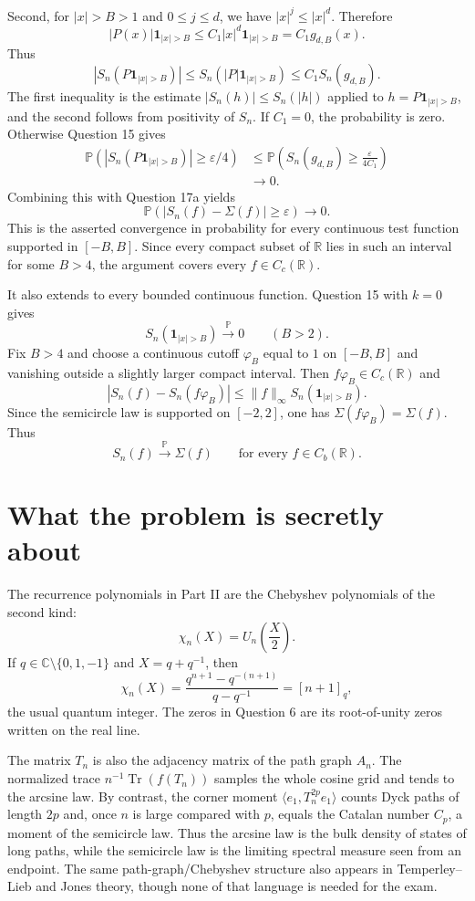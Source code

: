 \documentclass[11pt,a4paper]{article}
\newcommand{\R}{\mathbb{R}}
\newcommand{\C}{\mathbb{C}}
\newcommand{\Prob}{\mathbb{P}}
\newcommand{\one}{\mathbf{1}}
\DeclareMathOperator{\Tr}{Tr}
\begin{document}
Second, for $|x|>B>1$ and $0\le j\le d$, we have $|x|^j\le |x|^d$.  Therefore
\[
  |P(x)|\one_{|x|>B}
  \le C_1 |x|^d\one_{|x|>B}=C_1 g_{d,B}(x).
\]
Thus
\[
  |S_n(P\one_{|x|>B})|
  \le S_n(|P|\one_{|x|>B})
  \le C_1 S_n(g_{d,B}).
\]
The first inequality is the estimate $|S_n(h)|\le S_n(|h|)$ applied to
$h=P\one_{|x|>B}$, and the second follows from positivity of $S_n$.
If $C_1=0$, the probability is zero.  Otherwise Question 15 gives
\[
\begin{aligned}
 \Prob(|S_n(P\one_{|x|>B})|\ge\varepsilon/4)
 &\le \Prob\left(S_n(g_{d,B})\ge\frac{\varepsilon}{4C_1}\right)\\
 &\longrightarrow0.
\end{aligned}
\]
Combining this with Question 17a yields
\[
  \boxed{\Prob(|S_n(f)-\Sigma(f)|\ge\varepsilon)\longrightarrow0.}
\]
This is the asserted convergence in probability for every continuous test
function supported in $[-B,B]$.  Since every compact subset of $\R$ lies in
such an interval for some $B>4$, the argument covers every $f\in C_c(\R)$.

It also extends to every bounded continuous function.  Question 15 with
$k=0$ gives
\[
  S_n(\one_{|x|>B})\xrightarrow{\Prob}0\qquad(B>2).
\]
Fix $B>4$ and choose a continuous cutoff $\varphi_B$ equal to $1$ on
$[-B,B]$ and vanishing outside a slightly larger compact interval.  Then
$f\varphi_B\in C_c(\R)$ and
\[
  |S_n(f)-S_n(f\varphi_B)|
  \le \|f\|_\infty S_n(\one_{|x|>B}).
\]
Since the semicircle law is supported on $[-2,2]$, one has
$\Sigma(f\varphi_B)=\Sigma(f)$.  Thus
\[
  \boxed{S_n(f)\xrightarrow{\Prob}\Sigma(f)
  \qquad\text{for every }f\in C_b(\R).}
\]

\section{What the problem is secretly about}

The recurrence polynomials in Part II are the Chebyshev polynomials of the
second kind:
\[
  \chi_n(X)=U_n\!\left(\frac X2\right).
\]
If $q\in\C\setminus\{0,1,-1\}$ and $X=q+q^{-1}$, then
\[
  \chi_n(X)=\frac{q^{n+1}-q^{-(n+1)}}{q-q^{-1}}=[n+1]_q,
\]
the usual quantum integer.  The zeros in Question 6 are its root-of-unity
zeros written on the real line.

The matrix $T_n$ is also the adjacency matrix of the path graph $A_n$.
The normalized trace $n^{-1}\Tr(f(T_n))$ samples the whole cosine grid and
tends to the arcsine law.  By contrast, the corner moment
$\langle e_1,T_n^{2p}e_1\rangle$ counts Dyck paths of length $2p$ and,
once $n$ is large compared with $p$, equals the Catalan number $C_p$, a
moment of the semicircle law.  Thus the arcsine law is the bulk density of
states of long paths, while the semicircle law is the limiting spectral
measure seen from an endpoint.  The same path-graph/Chebyshev structure also
appears in Temperley--Lieb and Jones theory, though none of that language is
needed for the exam.
\end{document}
